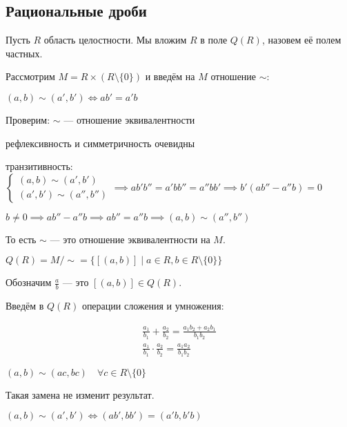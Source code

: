 \subsection{Рациональные дроби}

\begin{defn}
    Пусть $R$ область целостности. Мы вложим $R$ в поле $Q(R)$, назовем её полем частных.    
\end{defn}

Рассмотрим $M = R \times (R \setminus \{0\})$ и введём на $M$ отношение $\sim$:

$(a, b) \sim (a', b') \iff ab' = a'b$

Проверим: $\sim$ --- отношение эквивалентности

рефлексивность и симметричность очевидны

транзитивность:
$\begin{cases}
    (a, b) \sim (a', b')\\
    (a', b') \sim (a'', b'')
\end{cases} \implies ab'b'' = a'bb'' = a''bb' \implies b'(ab'' - a''b) = 0$

$b \neq 0 \implies ab'' - a''b \implies ab'' = a''b \implies (a, b) \sim (a'', b'')$

То есть $\sim$ --- это отношение эквивалентности на $M$.

$Q(R) = M / \sim = \{ [(a, b)] \mid a \in R, b \in R \setminus \{0\} \}$

\begin{defn}
    Обозначим $\frac{a}{b}$ --- это $[(a, b)] \in Q(R)$.
\end{defn}

Введём в $Q(R)$ операции сложения и умножения:

\begin{gather*}    
    \frac{a_1}{b_1} + \frac{a_2}{b_2} = \frac{a_1b_2 + a_2b_1}{b_1b_2}\\
    \frac{a_1}{b_1} \cdot \frac{a_2}{b_2} = \frac{a_1a_2}{b_1b_2}
\end{gather*}

\begin{notice}
    $(a, b) \sim (ac, bc) \quad \forall c \in R \setminus \{0\}$

    Такая замена не изменит результат.
\end{notice}

\begin{notice}
    $(a, b) \sim (a', b') \iff (ab', bb') = (a'b, b'b)$
\end{notice}

